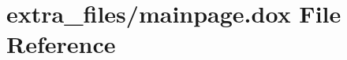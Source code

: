 \hypertarget{mainpage_8dox}{}\section{extra\+\_\+files/mainpage.dox File Reference}
\label{mainpage_8dox}
